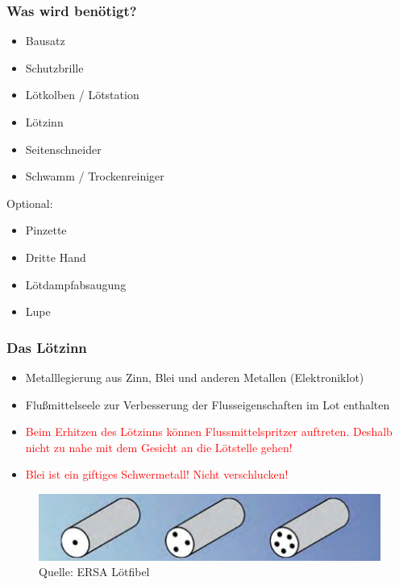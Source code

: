 \documentclass[10pt]{beamer}
\begin{document}
	\begin{frame}
		\frametitle{Was wird benötigt?}
		\begin{itemize}
			\item{Bausatz}
			\item{Schutzbrille}
			\item{Lötkolben / Lötstation}
			\item{Lötzinn}
			\item{Seitenschneider}
			\item{Schwamm / Trockenreiniger}
		\end{itemize}
		Optional:
		\begin{itemize}
			\item{Pinzette}
			\item{Dritte Hand}
			\item{Lötdampfabsaugung}
			\item{Lupe}	
		\end{itemize}
	\end{frame}

	\begin{frame}
	\frametitle{Das Lötzinn}
	\begin{itemize}
		\item{Metalllegierung aus Zinn, Blei und anderen Metallen (Elektroniklot)}
		\item{Flußmittelseele zur Verbesserung der Flusseigenschaften im Lot enthalten}
		\item{\textcolor{red}{Beim Erhitzen des Lötzinns können Flussmittelspritzer auftreten. Deshalb nicht zu nahe mit dem Gesicht an die Lötstelle gehen!}}
		\item{\textcolor{red}{Blei ist ein giftiges Schwermetall! Nicht verschlucken!}}
	\end{itemize}
	\begin{figure}[hbtp]
		\centering
		\includegraphics[width=\linewidth]{images/lotseele.png}
		\caption{Quelle: ERSA Lötfibel}
	\end{figure}
	\end{frame}
\end{document}
